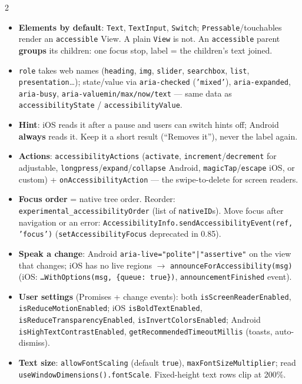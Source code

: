 \documentclass[8pt]{extarticle}
\newcommand\ct[1]{\texttt{#1}}
\newcommand\hd[1]{\par\vspace{3pt}\noindent{\bfseries\color{sheetBlue}#1}\par\vspace{1pt}}
\begin{document}
\begin{multicols}{2}
\raggedright{}

\hd{How it works}
\begin{itemize}
  \item \textbf{Elements by default}: \ct{Text}, \ct{TextInput}, \ct{Switch}; \ct{Pressable}/touchables
        render an \ct{accessible} View. A plain \ct{View} is not. An \ct{accessible} parent
        \textbf{groups} its children: one focus stop, label = the children's text joined.
  \item \ct{role} takes web names (\ct{heading}, \ct{img}, \ct{slider}, \ct{searchbox},
        \ct{list}, \ct{presentation}\ldots); state/value via \ct{aria-checked} (\ct{'mixed'}),
        \ct{aria-expanded}, \ct{aria-busy}, \ct{aria-valuemin/max/now/text} — same data as
        \ct{accessibilityState} / \ct{accessibilityValue}.
  \item \textbf{Hint}: iOS reads it after a pause and users can switch hints off; Android
        \textbf{always} reads it. Keep it a short result (``Removes it''), never the label again.
  \item \textbf{Actions}: \ct{accessibilityActions} (\ct{activate}, \ct{increment}/\ct{decrement}
        for adjustable, \ct{longpress}/\ct{expand}/\ct{collapse} Android, \ct{magicTap}/\ct{escape}
        iOS, or custom) + \ct{onAccessibilityAction} — the swipe-to-delete for screen readers.
  \item \textbf{Focus order} = native tree order. Reorder: \ct{experimental\_accessibilityOrder}
        (list of \ct{nativeID}s). Move focus after navigation or an error:
        \ct{AccessibilityInfo.sendAccessibilityEvent(ref, 'focus')} (\ct{setAccessibilityFocus}
        deprecated in 0.85).
  \item \textbf{Speak a change}: Android \ct{aria-live="polite"|"assertive"} on the view that
        changes; iOS has no live regions $\to$ \ct{announceForAccessibility(msg)} (iOS:
        \ct{\ldots WithOptions(msg, \{queue: true\})}, \ct{announcementFinished} event).
  \item \textbf{User settings} (Promises + change events): both \ct{isScreenReaderEnabled},
        \ct{isReduceMotionEnabled}; iOS \ct{isBoldTextEnabled}, \ct{isReduceTransparencyEnabled},
        \ct{isInvertColorsEnabled}; Android \ct{isHighTextContrastEnabled},
        \ct{getRecommendedTimeoutMillis} (toasts, auto-dismiss).
  \item \textbf{Text size}: \ct{allowFontScaling} (default \ct{true}), \ct{maxFontSizeMultiplier};
        read \ct{useWindowDimensions().fontScale}. Fixed-height text rows clip at 200\%.
\end{itemize}


\end{multicols}
\end{document}
